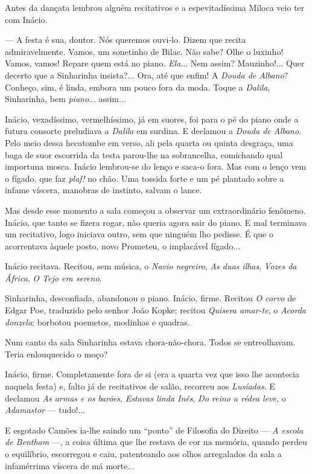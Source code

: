 Antes da dançata lembrou alguém recitativos e a espevitadíssima Miloca
veio ter com Inácio.

--- A festa é sua, doutor. Nós queremos ouvi-lo. Dizem que recita
admiravelmente. Vamos, um sonetinho de Bilac. Não sabe? Olhe o luxinho!
Vamos, vamos! Repare quem está no piano. \emph{Ela}... Nem assim?
Mauzinho!... Quer decerto que a Sinharinha insista?... Ora, até que
enfim! A \emph{Douda de Albano}? Conheço, sim, é linda, embora um pouco
fora da moda. Toque a \emph{Dalila}, Sinharinha, bem \emph{piano}...
assim...

Inácio, vexadíssimo, vermelhíssimo, já em suores, foi para o pé do piano
onde a futura consorte preludiava a \emph{Dalila} em surdina. E declamou
a \emph{Douda de Albano}. Pelo meio dessa hecatombe em verso, ali pela
quarta ou quinta desgraça, uma baga de suor escorrida da testa parou-lhe
na sobrancelha, comichando qual importuna mosca. Inácio lembrou-se do
lenço e saca-o fora. Mas com o lenço vem o fígado, que faz \emph{plaf!}
no chão. Uma tossida forte e um pé plantado sobre a infame víscera,
manobras de instinto, salvam o lance.

Mas desde esse momento a sala começou a observar um extraordinário
fenômeno. Inácio, que tanto se fizera rogar, não queria agora sair do
piano. E mal terminava um recitativo, logo iniciava outro, sem que
ninguém lho pedisse. É que o acorrentava àquele posto, novo Prometeu, o
implacável fígado...

Inácio recitava. Recitou, sem música, o \emph{Navio negreiro}, \emph{As
duas ilhas}, \emph{Vozes da África}, \emph{O Tejo era sereno}.

Sinharinha, desconfiada, abandonou o piano. Inácio, firme. Recitou
\emph{O corvo} de Edgar Poe, traduzido pelo senhor João Kopke; recitou
\emph{Quisera amar-te}, o \emph{Acorda donzela}; borbotou poemetos,
modinhas e quadras.

Num canto da sala Sinharinha estava chora-não-chora. Todos se
entreolhavam. Teria enlouquecido o moço?

Inácio, firme. Completamente fora de si (era a quarta vez que isso lhe
acontecia naquela festa) e, falto já de recitativos de salão, recorreu
aos \emph{Lusíadas}. E declamou \emph{As armas e os barões},
\emph{Estavas linda Inês}, \emph{Do reino a rédea leve}, o
\emph{Adamastor} --- tudo!...

E esgotado Camões ia-lhe saindo um ``ponto'' de Filosofia do Direito ---
\emph{A escola de Bentham} ---, a coisa última que lhe restava de cor na
memória, quando perdeu o equilíbrio, escorregou e caiu, patenteando aos
olhos arregalados da sala a infamérrima víscera de má morte...

